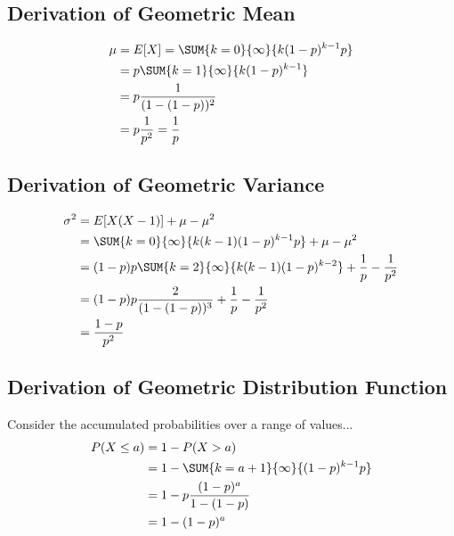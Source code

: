 \documentclass[10pt,]{book}
\theoremstyle{plain}
\theoremstyle{definition}
\theoremstyle{definition}
\numberwithin{equation}{section}
\newcommand{\gt}{ > }
\begin{document}
\subsection[Derivation of Geometric Mean]{Derivation of Geometric Mean}\label{subsection-17}
\begin{align*}
\mu & = E[X] = \SUM {k=0} {\infty} {k(1-p)^{k-1}p}\\
 & = p \SUM {k=1} {\infty} {k(1-p)^{k-1}}\\
 & = p \frac{1}{(1-(1-p))^2}\\
 & = p \frac{1}{p^2} = \frac{1}{p}
\end{align*}\typeout{************************************************}
\typeout{************************************************}
\subsection[Derivation of Geometric Variance]{Derivation of Geometric Variance}\label{subsection-18}
\begin{align*}
\sigma^2 & = E[X(X-1)] + \mu - \mu^2 \\
 & = \SUM {k=0} {\infty} {k(k-1)(1-p)^{k-1}p} + \mu - \mu^2 \\
 & = (1-p)p \SUM {k=2} {\infty} {k(k-1)(1-p)^{k-2}} + \frac{1}{p} - \frac{1}{p^2}\\
 & = (1-p)p \frac{2}{(1-(1-p))^3} + \frac{1}{p} - \frac{1}{p^2}\\
 & = \frac{1-p}{p^2}
\end{align*}\typeout{************************************************}
\typeout{************************************************}
\subsection[Derivation of Geometric Distribution Function]{Derivation of Geometric Distribution Function}\label{subsection-19}
 Consider the accumulated probabilities over a range of values...%
\begin{align*}
 P(X \le a) & = 1 - P(X \gt a)\\
 & = 1- \SUM {k={a+1}} {\infty} {(1-p)^{k-1}p}\\
 & = 1- p \frac{(1-p)^{a}}{1-(1-p)}\\
 & = 1- (1-p)^{a}
\end{align*}\typeout{************************************************}
\typeout{************************************************}
\end{document}
